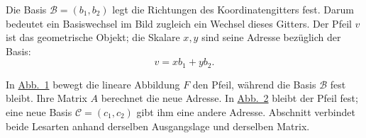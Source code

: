 \begin{runintext}
 Die Basis $\mathcal B=(b_1,b_2)$ legt die Richtungen des Koordinatengitters fest. Darum bedeutet ein Basiswechsel im Bild zugleich ein Wechsel dieses Gitters. Der Pfeil $v$ ist das geometrische Objekt; die Skalare $x,y$ sind seine Adresse bezüglich der Basis:
\[
  v=x b_1+y b_2.
\]

 In \hyperref[fig:transformation-fixed-basis]{Abb.~1} bewegt die lineare Abbildung $F$ den Pfeil, während die Basis $\mathcal B$ fest bleibt. Ihre Matrix $A$ berechnet die neue Adresse. In \hyperref[fig:basis-change-same-vector]{Abb.~2} bleibt der Pfeil fest; eine neue Basis $\mathcal C=(c_1,c_2)$ gibt ihm eine andere Adresse. Abschnitt  verbindet beide Lesarten anhand derselben Ausgangslage und derselben Matrix.
\end{runintext}

